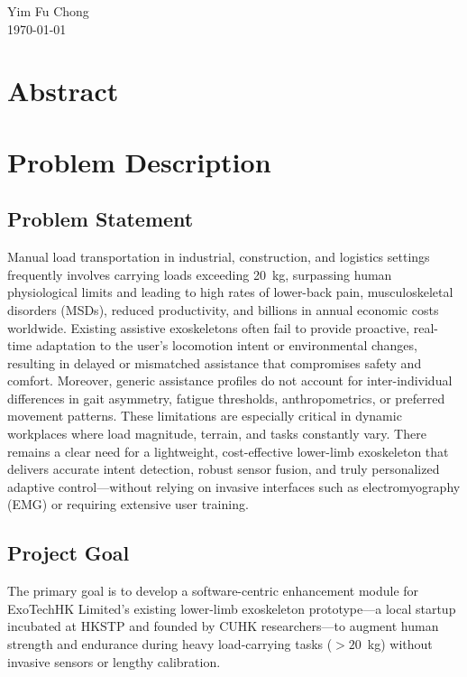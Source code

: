 \documentclass[12pt,a4paper]{report}
\begin{document}
\begin{flushright}
Yim Fu Chong\\
\today
\end{flushright}

\chapter*{Abstract}


\tableofcontents
\clearpage

\setcounter{page}{1}

\chapter{Problem Description}

\section{Problem Statement}
Manual load transportation in industrial, construction, and logistics settings frequently involves carrying loads exceeding 20~kg, surpassing human physiological limits and leading to high rates of lower-back pain, musculoskeletal disorders (MSDs), reduced productivity, and billions in annual economic costs worldwide. Existing assistive exoskeletons often fail to provide proactive, real-time adaptation to the user's locomotion intent or environmental changes, resulting in delayed or mismatched assistance that compromises safety and comfort. Moreover, generic assistance profiles do not account for inter-individual differences in gait asymmetry, fatigue thresholds, anthropometrics, or preferred movement patterns. These limitations are especially critical in dynamic workplaces where load magnitude, terrain, and tasks constantly vary. There remains a clear need for a lightweight, cost-effective lower-limb exoskeleton that delivers accurate intent detection, robust sensor fusion, and truly personalized adaptive control---without relying on invasive interfaces such as electromyography (EMG) or requiring extensive user training.

\section{Project Goal}
The primary goal is to develop a software-centric enhancement module for ExoTechHK Limited's existing lower-limb exoskeleton prototype---a local startup incubated at HKSTP and founded by CUHK researchers---to augment human strength and endurance during heavy load-carrying tasks ($>20$~kg) without invasive sensors or lengthy calibration.
\end{document}

